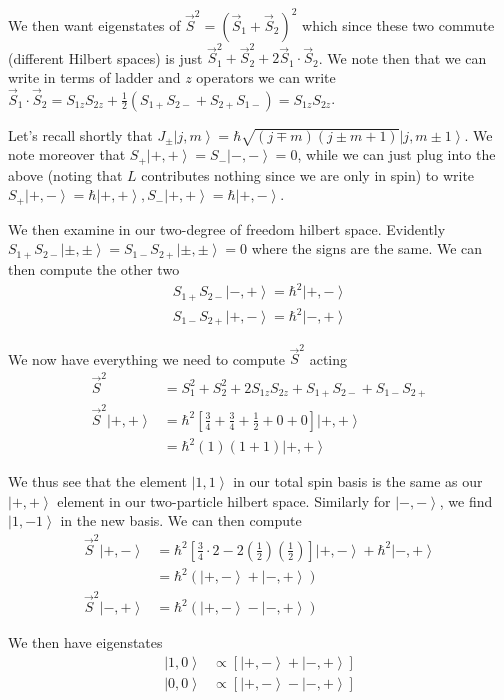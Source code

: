 \documentclass[10pt]{report}
\newcommand{\ket}[1]{\left|#1\right>}
\begin{document}
We then want eigenstates of $\vec{S}^2 = (\vec{S}_1 + \vec{S}_2)^2$ which since these two commute (different Hilbert spaces) is just $\vec{S}_1^2 + \vec{S}_2^2 + 2\vec{S}_1 \cdot\vec{S}_2$. We note then that we can write in terms of ladder and $z$ operators we can write $\vec{S}_1\cdot \vec{S}_2 = S_{1z} S_{2z} + \frac{1}{2}\left( S_{1+}S_{2-} + S_{2+}S_{1-} \right) = S_{1z}S_{2z}$.

Let's recall shortly that $J_{\pm}\ket{j,m} = \hbar\sqrt{\left( j\mp m \right)\left( j\pm m + 1 \right)} \ket{j, m\pm 1}$. We note moreover that $S_+ \ket{+,+} = S_- \ket{-,-} = 0$, while we can just plug into the above (noting that $L$ contributes nothing since we are only in spin) to write $S_+ \ket{+,-} = \hbar \ket{+,+}, S_- \ket{+, +} = \hbar \ket{+, -}$.

We then examine in our two-degree of freedom hilbert space. Evidently $S_{1+} S_{2-} \ket{\pm, \pm} =S_{1-} S_{2+} \ket{\pm, \pm} = 0$ where the signs are the same. We can then compute the other two
\begin{align*}
    S_{1+}S_{2-}\ket{-,+} = \hbar^2 \ket{+, -}\\
    S_{1-}S_{2+}\ket{+, -} = \hbar^2 \ket{-, +}
\end{align*}

We now have everything we need to compute $\vec{S}^2$ acting
\begin{align*}
    \vec{S}^2 &= S_1^2 + S_2^2 + 2S_{1z}S_{2z} + S_{1+} S_{2-} + S_{1-} S_{2+}\\
    \vec{S}^2 \ket{+, +} &= \hbar^2 \left[ \frac{3}{4} + \frac{3}{4} + \frac{1}{2} + 0 + 0  \right]\ket{+, +}\\
    &= \hbar^2(1)(1+1)\ket{+,+}
\end{align*}

We thus see that the element $\ket{1,1}$ in our total spin basis is the same as our $\ket{+,+}$ element in our two-particle hilbert space. Similarly for $\ket{-, -}$, we find $\ket{1,-1}$ in the new basis. We can then compute
\begin{align*}
    \vec{S}^2 \ket{+, -} &= \hbar^2\left[ \frac{3}{4}\cdot 2 - 2\left( \frac{1}{2} \right)\left( \frac{1}{2} \right) \right]\ket{+, -} + \hbar^2 \ket{-, +}\\
    &= \hbar^2\left(\ket{+, -} + \ket{-, +}\right)\\
    \vec{S}^2 \ket{-, +} &= \hbar^2\left(\ket{+, -} - \ket{-, +}\right)
\end{align*}

We then have eigenstates
\begin{align*}
    \ket{1,0} & \propto \left[ \ket{+, -} + \ket{-, +} \right]\\
    \ket{0,0} &\propto \left[ \ket{+, -} - \ket{-, +} \right]
\end{align*}
\end{document}
